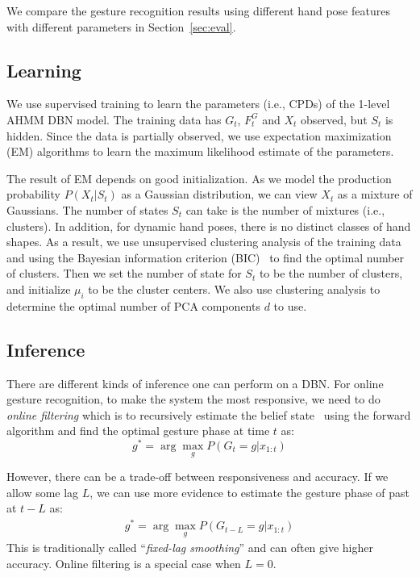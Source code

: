 \documentclass{acm_proc_article-sp}
\begin{document}
We compare the gesture recognition results using different hand pose features with different parameters in Section~\ref{sec:eval}.

\subsection{Learning}
We use supervised training to learn the parameters (i.e., CPDs) of the 1-level AHMM DBN model.
The training data has $G_t$, $F_t^G$ and $X_t$ observed, but $S_t$ is hidden.
Since the data is partially observed, we use expectation maximization (EM)
algorithms to learn the maximum likelihood estimate of the parameters. 

The result of EM depends on good initialization. As we model the production probability $P(X_t | S_t)$ as a Gaussian distribution, we
can view $X_t$ as a mixture of Gaussians. The number of states $S_t$ can take is the
number of mixtures (i.e., clusters). In addition, for dynamic hand poses, there is no
distinct classes of hand shapes. As a result, we use unsupervised clustering analysis of the training data and
using the Bayesian information criterion (BIC)~\cite{fraley12} to find the optimal number of clusters. 
Then we set the number of state for $S_t$
to be the number of clusters, and initialize $\mu_i$ to be the cluster centers. 
We also use clustering analysis to determine the optimal number of PCA components $d$ to use.

\subsection{Inference}
There are different kinds of inference one can perform on a DBN. For online gesture
recognition, to make the system the most responsive, we need to do \textit{online filtering} which is to recursively estimate the
belief state~\cite{murphy02} using the forward algorithm and find the optimal gesture phase
at time $t$ as:
\begin{displaymath}
g^* = \arg\max_g P(G_t = g | x_{1:t}) 
\end{displaymath}

However, there can be a trade-off between responsiveness and accuracy. If we allow some lag $L$,
we can use more evidence to estimate the gesture phase of past at $t - L$ as:
\begin{align*}
g^* = \arg\max_g P(G_{t - L} = g | x_{1 : t} )
\end{align*}
This is traditionally called ``\textit{fixed-lag smoothing}'' and can often give higher
accuracy. Online filtering is a special case when $L = 0$.
\end{document}
